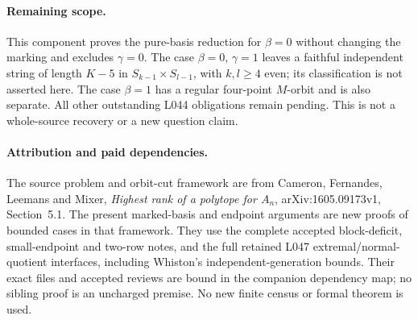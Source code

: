 \documentclass[11pt,a4paper]{article}
\begin{document}
\paragraph{Remaining scope.}
This component proves the pure-basis reduction for
$\beta=0$ without changing the marking and excludes
$\gamma=0$. The case $\beta=0$, $\gamma=1$ leaves a
faithful independent string of length $K-5$ in
$S_{k-1}\times S_{l-1}$, with $k,l\geq4$ even; its
classification is not asserted here. The case $\beta=1$
has a regular four-point $M$-orbit and is also separate.
All other outstanding L044 obligations remain pending.
This is not a whole-source recovery or a new question claim.
\paragraph{Attribution and paid dependencies.}
The source problem and orbit-cut framework are from Cameron, Fernandes,
Leemans and Mixer, \emph{Highest rank of a polytope for $A_n$},
arXiv:1605.09173v1, Section~5.1. The present marked-basis and endpoint
arguments are new proofs of bounded cases in that framework. They use
the complete accepted block-deficit, small-endpoint and two-row notes,
and the full retained L047 extremal/normal-quotient interfaces, including
Whiston's independent-generation bounds. Their exact files and accepted
reviews are bound in the companion dependency map; no sibling proof is
an uncharged premise. No new finite census or formal theorem is used.
\end{document}
